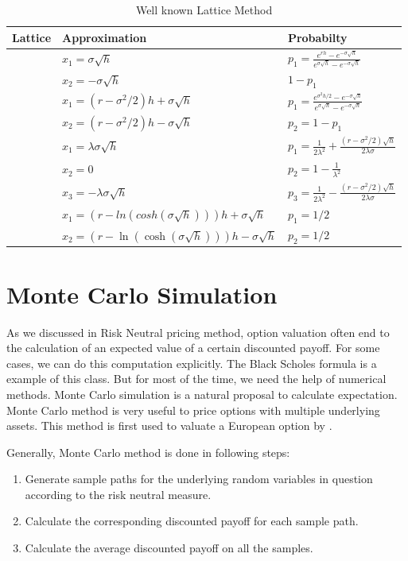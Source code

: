 \documentclass[12pt,oneside,titlepage]{book}
\begin{document}
\begin{table}[htdp]
\caption{Well known Lattice Method}
\begin{center}
\begin{tabular}{|l|l|l|}
\hline
Lattice & Approximation   & Probabilty \\
\hline
\cite{cox1979} & $x_1= \sigma\sqrt{h}$ & $p_1 =\frac{e^{rh}-e^{-\sigma\sqrt{h}}}{e^{\sigma\sqrt{h}}-e^{-\sigma\sqrt{h}}}$ \\
   &  $x_2=-\sigma\sqrt{h}$& $1-p_1$ \\
\hline
\cite{jarrow1983} & $x_1 = (r-\sigma^2 /2)h+\sigma\sqrt{h}$ & $p_1 = \frac{e^{\sigma^2 h/2}-e^{-\sigma\sqrt{h}}}{e^{\sigma\sqrt{h}}-e^{-\sigma\sqrt{h}}}$ \\   
& $x_2 =(r-\sigma^2 /2)h - \sigma\sqrt{h}$ & $p_2 = 1- p_1$ \\
\hline
\cite{Boyle1986} & $x_1 = \lambda\sigma\sqrt{h}$ & $p_1 = \frac{1}{2\lambda^2} + \frac{(r-\sigma^2 /2)\sqrt{h}}{2\lambda\sigma}$ \\
 & $x_2 = 0$ & $p_2 = 1-\frac{1}{\lambda^2}$ \\
 & $x_3 = -\lambda\sigma\sqrt{h}$ & $p_3 = \frac{1}{2\lambda^2} - \frac{(r-\sigma^2 /2)\sqrt{h}}{2\lambda\sigma}$\\
\hline
\cite{Amin1991} & $x_1 =(r-ln(cosh(\sigma\sqrt{h})))h + \sigma\sqrt{h}$ & $p_1 = 1/2$ \\
& $x_2 = (r-\ln(\cosh(\sigma\sqrt{h})))h-\sigma\sqrt{h}$ & $p_2 = 1/2$ \\
\hline
\end{tabular}
\end{center}
\label{default}
\end{table}%

\section{Monte Carlo Simulation}
As we discussed in Risk Neutral pricing method, option valuation often end to the calculation of an expected value of a certain discounted payoff. For some cases, we can do this computation explicitly. The Black Scholes formula is a example of this class. But for most of the time, we need the help of numerical methods. Monte Carlo simulation is a natural proposal to calculate expectation. Monte Carlo method is very useful to price options with multiple underlying assets. This method is first used to valuate a European option by \cite{Boyle1977}. 

Generally, Monte Carlo method is done in following steps: 
\begin{enumerate}[1.]
\item 
Generate sample paths for the underlying random variables in question according to the risk neutral measure. 
\item
Calculate the corresponding discounted payoff for each sample path.
\item
Calculate the average discounted payoff on all the samples.
\end{enumerate}
\end{document}
